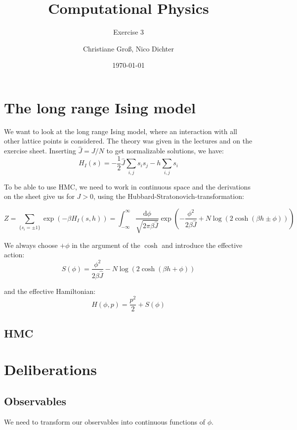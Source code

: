 \documentclass{scrartcl}
\title{Computational Physics}
\subtitle{Exercise 3}
\date{\today}
\author{Christiane Groß, Nico Dichter}
\begin{document}
	\maketitle
\section{The long range Ising model}
We want to look at the long range Ising model, where an interaction with all other lattice points is considered. The theory was given in the lectures and on the exercise sheet. Inserting $\hat{J}=J/N$ to get normalizable solutions, we have: 
\begin{equation}
H_I(s)=-\frac{1}{2}\hat{J}\sum_{i,j}s_is_j-h\sum_{i,j}s_i
\label{eq:hamiltonianising}
\end{equation}

To be able to use HMC, we need to work in continuous space and the derivations on the sheet give us for $J>0$, using the Hubbard-Stratonovich-transformation:

\begin{equation}
Z=\sum_{\{s_i=\pm1\}}\exp(-\beta H_I(s,h))=
\int_{-\infty}^{\infty}\frac{\mathrm{d} \phi}{\sqrt{2\pi\beta\hat{J}}}
\exp\left( -\frac{\phi^2}{2\beta\hat{J}}+N\log\left( 2\cosh(\beta h\pm\phi)\right) \right) 
\label{eq:partfunc}
\end{equation}


We always choose $+\phi$ in the argument of the $\cosh$ and introduce the effective action:
\begin{equation}
S(\phi)=\frac{\phi^2}{2\beta\hat{J}}-N\log\left( 2\cosh(\beta h+\phi)\right)
\end{equation}

and the effective Hamiltonian:
\begin{equation}
H(\phi, p)=\frac{p^2}{2}+S(\phi)
\end{equation}

\subsection{HMC}

\section{Deliberations}

\subsection{Observables}
We need to transform our observables into continuous functions of $\phi$.
\end{document}
